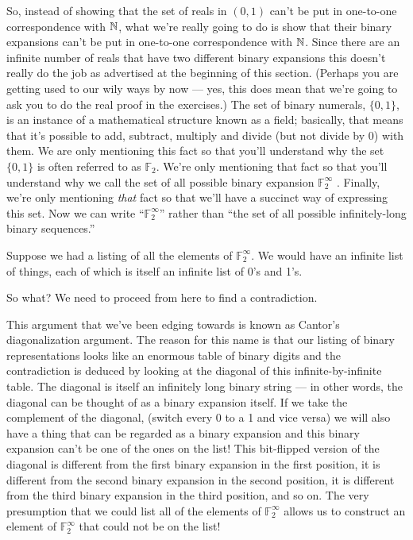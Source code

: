 So, instead of showing that the set of reals in $(0, 1)$ can't be put 
in one-to-one
correspondence with ${\mathbb N}$, what we're really going to do is show 
that their binary expansions can't be put in one-to-one correspondence 
with ${\mathbb N}$.  Since
there are an infinite number of reals that have two different binary expansions
this doesn't really do the job as advertised at the beginning of this section.
(Perhaps you are getting used to our wily ways by now --- yes, this does
mean that we're going to ask you to do the real proof in the exercises.)
The set of binary numerals, $\{0, 1\}$, is an instance of a mathematical 
structure known as a field; basically, that means that it's possible to 
add, subtract, multiply and divide (but not divide by 0) with them. 
We are only mentioning this fact so that you'll understand why the set 
$\{0, 1\}$ is often referred to as ${\mathbb F}_2$.  We're only mentioning that 
fact so that you'll understand why we call the set of all possible 
binary expansion ${\mathbb F}_2^\infty$ .  Finally, we're only mentioning \emph{that} 
fact so that we'll have a succinct way of expressing this set.  
Now we can write ``${\mathbb F}_2^\infty$'' rather than 
``the set of all possible infinitely-long binary sequences.''

Suppose we had a listing of all the elements of ${\mathbb F}_2^\infty$.  We would have an
infinite list of things, each of which is itself an infinite list 
of 0's and 1's.

So what? We need to proceed from here to find a contradiction.

This argument that we've been edging towards is known as Cantor's 
diagonalization argument.  The reason for this name is that our 
listing of binary representations looks like an enormous table 
of binary digits and the contradiction is deduced by looking at 
the diagonal of this infinite-by-infinite table.
The diagonal is itself an infinitely long binary string --- in other words, the
diagonal can be thought of as a binary expansion itself.  
If we take the complement
of the diagonal, (switch every 0 to a 1 and vice versa) we will also
have a thing that can be regarded as a binary expansion and this binary
expansion can't be one of the ones on the list!  This bit-flipped version of
the diagonal is different from the first binary expansion in the first 
position,
it is different from the second binary expansion in the second position, it is
different from the third binary expansion in the third position, and so on.
The very presumption that we could list all of the elements of ${\mathbb F}_2^\infty$ 
allows us
to construct an element of ${\mathbb F}_2^\infty$ that could not be on the list!

